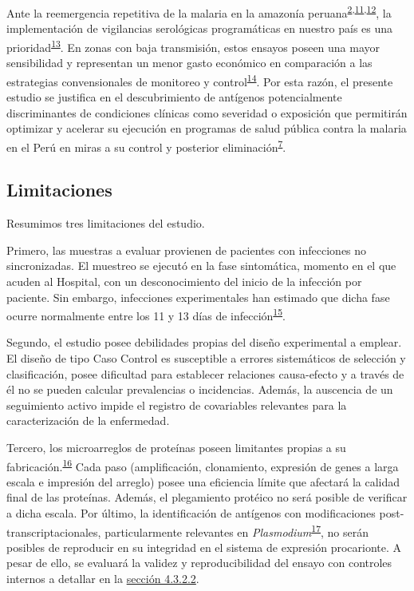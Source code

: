\documentclass[]{article}
\begin{document}
Ante la reemergencia repetitiva de la malaria en la amazonía
peruana\textsuperscript{\protect\hyperlink{ref-rosas2016peru}{2},\protect\hyperlink{ref-griffing2013history}{11},\protect\hyperlink{ref-soto2017spatio}{12}},
la implementación de vigilancias serológicas programáticas en nuestro
país es una
prioridad\textsuperscript{\protect\hyperlink{ref-hotspots2015}{13}}. En
zonas con baja transmisión, estos ensayos poseen una mayor sensibilidad
y representan un menor gasto económico en comparación a las estrategias
convensionales de monitoreo y
control\textsuperscript{\protect\hyperlink{ref-elliott2014}{14}}. Por
esta razón, el presente estudio se justifica en el descubrimiento de
antígenos potencialmente discriminantes de condiciones clínicas como
severidad o exposición que permitirán optimizar y acelerar su ejecución
en programas de salud pública contra la malaria en el Perú en miras a su
control y posterior
eliminación\textsuperscript{\protect\hyperlink{ref-accelerate2016}{7}}.

\subsection{Limitaciones}\label{limit}

Resumimos tres limitaciones del estudio.

Primero, las muestras a evaluar provienen de pacientes con infecciones
no sincronizadas. El muestreo se ejecutó en la fase sintomática, momento
en el que acuden al Hospital, con un desconocimiento del inicio de la
infección por paciente. Sin embargo, infecciones experimentales han
estimado que dicha fase ocurre normalmente entre los 11 y 13 días de
infección\textsuperscript{\protect\hyperlink{ref-arevalo2014}{15}}.

Segundo, el estudio posee debilidades propias del diseño experimental a
emplear. El diseño de tipo Caso Control es susceptible a errores
sistemáticos de selección y clasificación, posee dificultad para
establecer relaciones causa-efecto y a través de él no se pueden
calcular prevalencias o incidencias. Además, la auscencia de un
seguimiento activo impide el registro de covariables relevantes para la
caracterización de la enfermedad.

Tercero, los microarreglos de proteínas poseen limitantes propias a su
fabricación.\textsuperscript{\protect\hyperlink{ref-vigil2010}{16}} Cada
paso (amplificación, clonamiento, expresión de genes a larga escala e
impresión del arreglo) posee una eficiencia límite que afectará la
calidad final de las proteínas. Además, el plegamiento protéico no será
posible de verificar a dicha escala. Por último, la identificación de
antígenos con modificaciones post-transcriptacionales, particularmente
relevantes en
\emph{Plasmodium}\textsuperscript{\protect\hyperlink{ref-leroch2009postmod}{17}},
no serán posibles de reproducir en su integridad en el sistema de
expresión procarionte. A pesar de ello, se evaluará la validez y
reproducibilidad del ensayo con controles internos a detallar en la
\protect\hyperlink{validez}{sección 4.3.2.2}.
\end{document}
